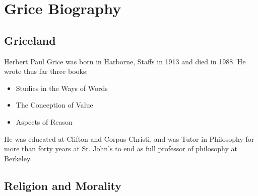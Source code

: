 \documentclass[10pt,titlepage]{book}
\begin{document}
\chapter{Grice Biography}

\section{Griceland}

Herbert Paul Grice was born in Harborne, Staffs 
in 1913 and died in 1988.
He wrote thus far three books:
\begin{itemize}
\item Studies in the Ways of Words \cite{grice89}
\item The Conception of Value \cite{grice91}
\item Aspects of Reason \cite{grice01}
\end{itemize}
He was educated at Clifton and Corpus Christi, 
and was Tutor in Philosophy for more than forty years at St. John's to end as full professor of philosophy at Berkeley.

\section{Religion and Morality}
\end{document}
